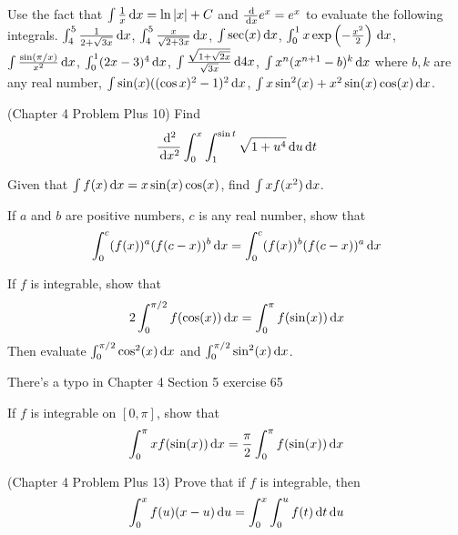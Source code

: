 \documentclass[Calculus 1 Recitation.tex]{subfiles}
\begin{document}
\begin{myleftlinebox}
	Use the fact that $\int \frac{1}{x}\,\mathrm{d} x=\ln\left\vert x\right\vert+C$ and $\frac{\,\mathrm{d}}{\,\mathrm{d} x}e^x=e^x$ to evaluate the following integrals. $\int_4^5 \frac{1}{2+\sqrt{3x}}\,\mathrm{d} x$, $\int_4^5 \frac{x}{\sqrt{2+3x}}\,\mathrm{d} x$, $\int \sec(x)\,\mathrm{d} x$, $\int_0^1 x \exp\left( -\frac{x^2}{2} \right)\,\mathrm{d} x$, $\int \frac{\sin(\pi/x)}{x^2}\,\mathrm{d} x$, $\int_0^1 (2x-3)^4 \,\mathrm{d} x$, $\int \frac{\sqrt{1+\sqrt{2x}}}{\sqrt{3x}}\,\mathrm{d} 4x$, $\int x^n(x^{n+1}-b)^k\,\mathrm{d} x$ where $b,k$ are any real number, $\int \sin(x)((\cos x)^2-1)^2\,\mathrm{d} x$, $\int x\sin^2(x)+x^2\sin(x)\cos(x) \,\mathrm{d} x$.
	\tcblower
	\vspace{2em}
\end{myleftlinebox}

\begin{myleftlinebox}
	(Chapter 4 Problem Plus 10) Find
	\[\frac{\,\mathrm{d}^2}{\,\mathrm{d} x^2} \int_0^x \int_1^{\sin t} \sqrt{1+u^4} \,\mathrm{d} u\,\mathrm{d} t\]
	\tcblower
	\vspace{2em}
\end{myleftlinebox}

\begin{myleftlinebox}
	Given that $\int f(x)\,\mathrm{d} x=x\sin(x)\cos(x)$, find $\int xf(x^2)\,\mathrm{d} x$.
	\tcblower
	\vspace{2em}
\end{myleftlinebox}


\begin{myleftlinebox}
	If $a$ and $b$ are positive numbers, $c$ is any real number, show that
	\[\int_0^c (f(x))^a(f(c-x))^b\,\mathrm{d} x = \int_0^c (f(x))^b(f(c-x))^a\,\mathrm{d} x\]
	\tcblower
	\vspace{2em}
\end{myleftlinebox}

\begin{myleftlinebox}
	If $f$ is integrable, show that 
	\[2\int_0^{\pi/2} f(\cos(x))\,\mathrm{d} x=\int_0^\pi f(\sin(x))\,\mathrm{d} x\]
	Then evaluate $\int_0^{\pi/2}\cos^2(x)\,\mathrm{d} x$ and $\int_0^{\pi/2}\sin^2(x)\,\mathrm{d} x$.
	\begin{remark2}
		There's a typo in Chapter 4 Section 5 exercise 65
	\end{remark2}
	\tcblower
	\vspace{2em}
\end{myleftlinebox}

\begin{myleftlinebox}
	If $f$ is integrable on $[0,\pi]$, show that 
	\[\int_0^\pi x f(\sin(x))\,\mathrm{d} x = \frac{\pi}{2}\int_0^\pi f(\sin(x))\,\mathrm{d} x\]
	\tcblower
	\vspace{2em}
\end{myleftlinebox}

\begin{myleftlinebox}
	(Chapter 4 Problem Plus 13) Prove that if $f$ is integrable, then 
	\[\int_0^x f(u)(x-u)\,\mathrm{d} u = \int_0^x \int_0^u f(t)\,\mathrm{d} t\,\mathrm{d} u\]
	\tcblower
	\vspace{2em}
\end{myleftlinebox}
\end{document}
